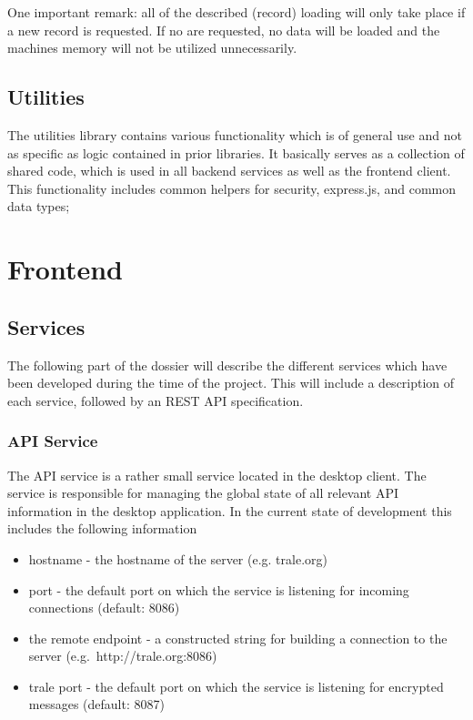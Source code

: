 One important remark: all of the described (record) loading will only take place if a new record is requested.
If no are requested, no data will be loaded and the machines memory will not be utilized unnecessarily.

\subsection{Utilities}\label{subsec:utilities}
The utilities library contains various functionality which is of general use and not as specific as logic contained in prior libraries.
It basically serves as a collection of shared code, which is used in all backend services as well as the frontend client.
This functionality includes common helpers for security, express.js, and common data types;

\section{Frontend}\label{sec:frontend}

\subsection{Services}\label{subsec:services}

The following part of the dossier will describe the different services which have been developed during the time of the project.
This will include a description of each service, followed by an REST API specification.

\subsubsection{API Service}\label{subsubsec:api-service}

The API service is a rather small service located in the desktop client.
The service is responsible for managing the global state of all relevant API information in the desktop application.
In the current state of development this includes the following information

\begin{itemize}
    \item hostname - the hostname of the server (e.g. trale.org)
    \item port - the default port on which the service is listening for incoming connections (default: 8086)
    \item the remote endpoint - a constructed string for building a connection to the server (e.g.\ http://trale.org:8086)
    \item trale port - the default port on which the service is listening for encrypted messages (default: 8087)
\end{itemize}

